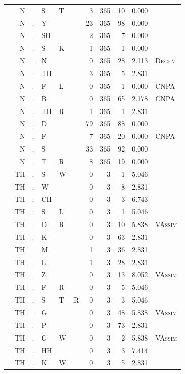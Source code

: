 \documentclass[12pt]{article}
\begin{document}
\begin{longtable}{r@{ } r@{ } c@{ } l@{ } l@{ } l@{ } r r r r l }
 & N & . & S & T &  & 3 & 365 & 10 & 0.000 &  \\
 & N & . & Y &  &  & 23 & 365 & 98 & 0.000 &  \\
 & N & . & SH &  &  & 2 & 365 & 7 & 0.000 &  \\
 & N & . & S & K &  & 1 & 365 & 1 & 0.000 &  \\
 & N & . & N &  &  & 0 & 365 & 28 & 2.113 & \textsc{Degem} \\
 & N & . & TH &  &  & 3 & 365 & 5 & 2.831 &  \\
 & N & . & F & L &  & 0 & 365 & 1 & 0.000 & \textsc{CNPA} \\
 & N & . & B &  &  & 0 & 365 & 65 & 2.178 & \textsc{CNPA} \\
 & N & . & TH & R &  & 1 & 365 & 1 & 2.831 &  \\
 & N & . & D &  &  & 79 & 365 & 88 & 0.000 &  \\
 & N & . & F &  &  & 7 & 365 & 20 & 0.000 & \textsc{CNPA} \\
 & N & . & S &  &  & 33 & 365 & 92 & 0.000 &  \\
 & N & . & T & R &  & 8 & 365 & 19 & 0.000 &  \\
 & TH & . & S & W &  & 0 & 3 & 1 & 5.046 &  \\
 & TH & . & W &  &  & 0 & 3 & 8 & 2.831 &  \\
 & TH & . & CH &  &  & 0 & 3 & 3 & 6.743 &  \\
 & TH & . & S & L &  & 0 & 3 & 1 & 5.046 &  \\
 & TH & . & D & R &  & 0 & 3 & 10 & 5.838 & \textsc{VAssim} \\
 & TH & . & K &  &  & 0 & 3 & 63 & 2.831 &  \\
 & TH & . & M &  &  & 1 & 3 & 36 & 2.831 &  \\
 & TH & . & L &  &  & 1 & 3 & 28 & 2.831 &  \\
 & TH & . & Z &  &  & 0 & 3 & 13 & 8.052 & \textsc{VAssim} \\
 & TH & . & F & R &  & 0 & 3 & 5 & 5.046 &  \\
 & TH & . & S & T & R & 0 & 3 & 3 & 5.046 &  \\
 & TH & . & G &  &  & 0 & 3 & 48 & 5.838 & \textsc{VAssim} \\
 & TH & . & P &  &  & 0 & 3 & 73 & 2.831 &  \\
 & TH & . & G & W &  & 0 & 3 & 2 & 5.838 & \textsc{VAssim} \\
 & TH & . & HH &  &  & 0 & 3 & 3 & 7.414 &  \\
 & TH & . & K & W &  & 0 & 3 & 5 & 2.831 &  \\

\end{longtable}
\end{document}
